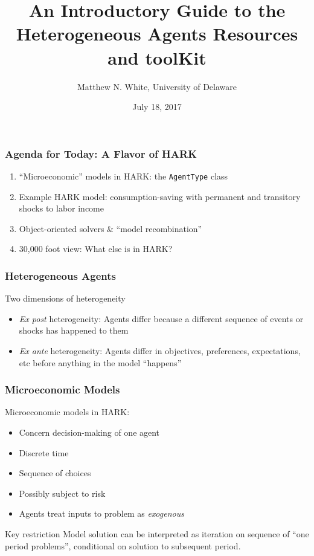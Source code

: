 \documentclass[11ptt]{beamer}
\author{Matthew N. White, University of Delaware}
\title{An Introductory Guide to the \\ Heterogeneous Agents Resources and toolKit}
\date{July 18, 2017}
\newcommand{\bi}{\begin{itemize}}
\newcommand{\ei}{\end{itemize}}
\begin{document}
\begin{frame}
\maketitle
\end{frame}


\begin{frame}
\frametitle{Agenda for Today: A Flavor of HARK}
\begin{enumerate}
\item ``Microeconomic'' models in HARK: the \texttt{AgentType} class

\item Example HARK model: consumption-saving with permanent and transitory shocks to labor income

\item Object-oriented solvers \& ``model recombination''

\item 30,000 foot view: What else is in HARK?
\end{enumerate}
\end{frame}


\begin{frame}
\frametitle{Heterogeneous Agents}
\begin{block}{Two dimensions of heterogeneity}
\bi
\item \textit{Ex post} heterogeneity: Agents differ because a different sequence of events or shocks has happened to them

\item \textit{Ex ante} heterogeneity: Agents differ in objectives, preferences, expectations, etc before anything in the model ``happens''
\ei
\end{block}

\end{frame}


\begin{frame}
\frametitle{Microeconomic Models}
\begin{block}{Microeconomic models in HARK:}
\bi
\item Concern decision-making of one agent

\item Discrete time

\item Sequence of choices

\item Possibly subject to risk

\item Agents treat inputs to problem as \textit{exogenous}
\ei
\end{block}

\begin{block}{Key restriction}
Model solution can be interpreted as iteration on sequence of ``one period problems'', conditional on solution to subsequent period.
\end{block}
\end{frame}
\end{document}
